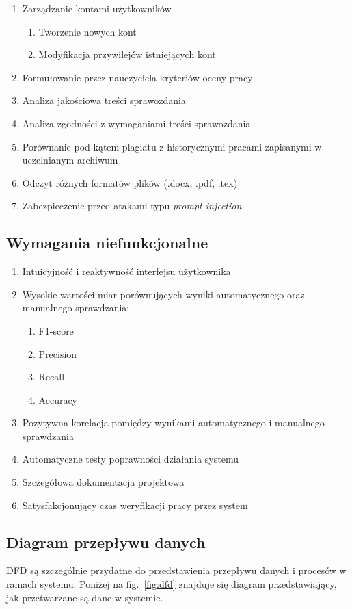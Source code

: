 \documentclass[a4paper, 12pt]{article}
\begin{document}
\begin{enumerate}
    \item Zarządzanie kontami użytkowników
    \begin{enumerate}
        \item Tworzenie nowych kont
        \item Modyfikacja przywilejów istniejących kont
    \end{enumerate}
    \item Formułowanie przez nauczyciela kryteriów oceny pracy
    \item Analiza jakościowa treści sprawozdania
    \item Analiza zgodności z wymaganiami treści sprawozdania
    \item Porównanie pod kątem plagiatu z historycznymi pracami zapisanymi w uczelnianym archiwum
    \item Odczyt różnych formatów plików (.docx, .pdf, .tex)
    \item Zabezpieczenie przed atakami typu \textit{prompt injection}
\end{enumerate}

\subsection{Wymagania niefunkcjonalne}

\begin{enumerate}
    \item Intuicyjność i reaktywność interfejsu użytkownika
    \item Wysokie wartości miar porównujących wyniki automatycznego oraz manualnego sprawdzania:
    \begin{enumerate}
        \item F1-score
        \item Precision
        \item Recall
        \item Accuracy
    \end{enumerate}
    \item Pozytywna korelacja pomiędzy wynikami automatycznego i manualnego sprawdzania
    \item Automatyczne testy poprawności działania systemu
    \item Szczegółowa dokumentacja projektowa
    \item Satysfakcjonujący czas weryfikacji pracy przez system
\end{enumerate}

\subsection{Diagram przepływu danych}
DFD są szczególnie przydatne do przedstawienia przepływu danych i procesów w ramach systemu.
Poniżej na fig.~\ref{fig:dfd} znajduje się diagram przedstawiający, jak przetwarzane są dane w systemie.
\end{document}
